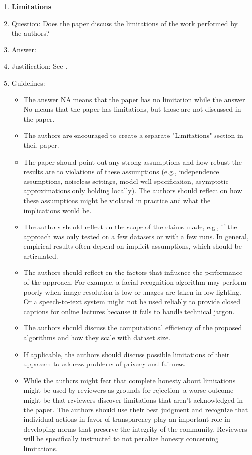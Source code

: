 \begin{enumerate}
\item {\bf Limitations}
\item[] Question: Does the paper discuss the limitations of the work performed by the authors?
\item[] Answer: \answerYes{} %
\item[] Justification: See .
\item[] Guidelines:
  \begin{itemize}
  \item The answer NA means that the paper has no limitation while the answer No means that the paper has limitations, but those are not discussed in the paper.
  \item The authors are encouraged to create a separate "Limitations" section in their paper.
  \item The paper should point out any strong assumptions and how robust the results are to violations of these assumptions (e.g., independence assumptions, noiseless settings, model well-specification, asymptotic approximations only holding locally). The authors should reflect on how these assumptions might be violated in practice and what the implications would be.
  \item The authors should reflect on the scope of the claims made, e.g., if the approach was only tested on a few datasets or with a few runs. In general, empirical results often depend on implicit assumptions, which should be articulated.
  \item The authors should reflect on the factors that influence the performance of the approach. For example, a facial recognition algorithm may perform poorly when image resolution is low or images are taken in low lighting. Or a speech-to-text system might not be used reliably to provide closed captions for online lectures because it fails to handle technical jargon.
  \item The authors should discuss the computational efficiency of the proposed algorithms and how they scale with dataset size.
  \item If applicable, the authors should discuss possible limitations of their approach to address problems of privacy and fairness.
  \item While the authors might fear that complete honesty about limitations might be used by reviewers as grounds for rejection, a worse outcome might be that reviewers discover limitations that aren't acknowledged in the paper. The authors should use their best judgment and recognize that individual actions in favor of transparency play an important role in developing norms that preserve the integrity of the community. Reviewers will be specifically instructed to not penalize honesty concerning limitations.
  \end{itemize}


\end{enumerate}
